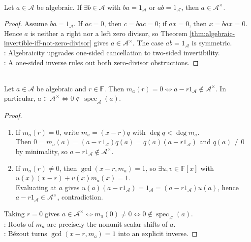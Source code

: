 \begin{corollary} \label{cor:algebraic-one-sided-inverse-two-sided} \\
Let $a\in\mathcal{A}$ be algebraic. If $\exists b\in\mathcal{A}$ with $ba=1_{\mathcal{A}}$ or $ab=1_{\mathcal{A}}$, then $a\in\mathcal{A}^{\times}$.
\begin{proof}
Assume $ba=1_{\mathcal{A}}$. If $ac=0$, then $c=bac=0$; if $ax=0$, then $x=bax=0$. Hence $a$ is neither a right nor a left zero divisor, so Theorem \ref{thm:algebraic-invertible-iff-not-zero-divisor} gives $a\in\mathcal{A}^{\times}$. The case $ab=1_{\mathcal{A}}$ is symmetric.\\
: Algebraicity upgrades one-sided cancellation to two-sided invertibility.\\
: A one-sided inverse rules out both zero-divisor obstructions.
\end{proof}
\end{corollary}

\begin{theorem} \label{thm:minimal-polynomial-roots-by-algebra-invertibility} \\
Let $a\in\mathcal{A}$ be algebraic and $r\in\mathbb{F}$. Then $m_a(r)=0\Longleftrightarrow a-r1_{\mathcal{A}}\notin\mathcal{A}^{\times}$. In particular, $a\in\mathcal{A}^{\times}\Longleftrightarrow0\notin\operatorname{spec}_{\mathcal{A}}(a)$.
\begin{proof}
\begin{enumerate}[label=\roman*.]
\setlength{\itemsep}{0pt}
\item[$(\Rightarrow)$] If $m_a(r)=0$, write $m_a=(x-r)q$ with $\deg q<\deg m_a$.\\
Then $0=m_a(a)=(a-r1_{\mathcal{A}})q(a)=q(a)(a-r1_{\mathcal{A}})$ and $q(a)\neq0$ by minimality, so $a-r1_{\mathcal{A}}\notin\mathcal{A}^{\times}$.
\item[$(\Leftarrow)$] If $m_a(r)\neq0$, then $\gcd(x-r,m_a)=1$, so $\exists u,v\in\mathbb{F}[x]$ with $u(x)(x-r)+v(x)m_a(x)=1$.\\
Evaluating at $a$ gives $u(a)(a-r1_{\mathcal{A}})=1_{\mathcal{A}}=(a-r1_{\mathcal{A}})u(a)$, hence $a-r1_{\mathcal{A}}\in\mathcal{A}^{\times}$, contradiction.
\end{enumerate}
Taking $r=0$ gives $a\in\mathcal{A}^{\times}\Longleftrightarrow m_a(0)\neq0\Longleftrightarrow0\notin\operatorname{spec}_{\mathcal{A}}(a)$.\\
: Roots of $m_a$ are precisely the nonunit scalar shifts of $a$.\\
: Bézout turns $\gcd(x-r,m_a)=1$ into an explicit inverse.
\end{proof}
\end{theorem}

